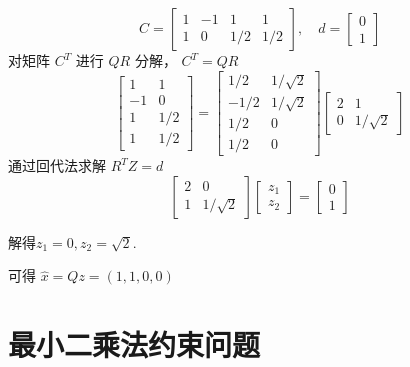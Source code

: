 \begin{example}
    \begin{equation}
C=\left[\begin{array}{cccc}
1 & -1 & 1 & 1 \\
1 & 0 & 1 / 2 & 1 / 2
\end{array}\right], \quad d=\left[\begin{array}{l}
0 \\
1
\end{array}\right]
\end{equation}
对矩阵 $ C^{T} $ 进行 $ Q R $ 分解， $ C^{T}=Q R $
\begin{equation}
\left[\begin{array}{cc}
1 & 1 \\
-1 & 0 \\
1 & 1 / 2 \\
1 & 1 / 2
\end{array}\right]=\left[\begin{array}{cc}
1 / 2 & 1 / \sqrt{2} \\
-1 / 2 & 1 / \sqrt{2} \\
1 / 2 & 0 \\
1 / 2 & 0
\end{array}\right]\left[\begin{array}{cc}
2 & 1 \\
0 & 1 / \sqrt{2}
\end{array}\right]
\end{equation}
通过回代法求解 $ R^{T} Z=d $
\begin{equation}
\left[\begin{array}{cc}
2 & 0 \\
1 & 1 / \sqrt{2}
\end{array}\right]\left[\begin{array}{l}
z_{1} \\
z_{2}
\end{array}\right]=\left[\begin{array}{l}
0 \\
1
\end{array}\right]
\end{equation}

解得$
 z_{1}=0, z_{2}=\sqrt{2}
$.

可得 $ \hat{x}=Q z=(1,1,0,0) $
\end{example}

\section{最小二乘法约束问题}


